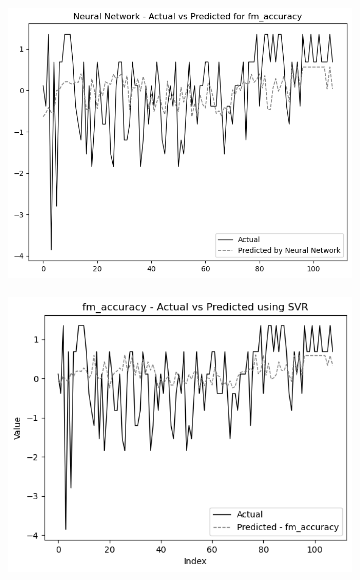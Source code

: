 \begin{figure}
    \begin{subfigure}[b]{0.49\textwidth}
        \centering
        \includegraphics[width=\textwidth]{images/nnCharts/all_data_fine_motor_accuracy.png}
        
    \end{subfigure}\hfill
    \begin{subfigure}[b]{0.49\textwidth}
        \centering
        \includegraphics[width=\textwidth]{images/regressionCharts/all_data_fine_motor_accuracy.png}
        
    \end{subfigure}
    

\end{figure}
